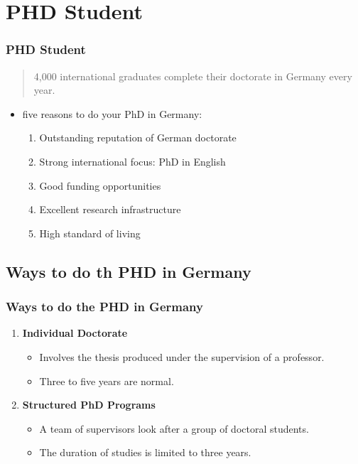 \documentclass[9pt, compress]{beamer}
\begin{document}
    \section{PHD Student }
    \begin{frame} 
        \frametitle{PHD Student}
        \begin{quotation}
            4,000 international graduates complete their doctorate in Germany every year.
        \end{quotation}
        \begin{itemize}
            \item five reasons to do your PhD in Germany:
            \begin{enumerate}
                \setcounter{enumi}{0}
                \item Outstanding reputation of German doctorate
                \item Strong international focus: PhD in English
                \item Good funding opportunities 
                \item Excellent research infrastructure
                \item High standard of living           
            \end{enumerate}
        \end{itemize}
    \end{frame}
    \subsection{Ways to do th PHD in Germany}
    \begin{frame} 
        \frametitle{Ways to do the PHD in Germany}
        \begin{enumerate}
            \setcounter{enumi}{0}
            \item \textbf{Individual Doctorate}
            \begin{itemize}
                \item Involves the thesis produced under the supervision of a professor. 
                \item Three to five years are normal. 
            \end{itemize}
            \item \textbf{Structured PhD Programs}
            \begin{itemize}
                \item A team of supervisors look after a group of doctoral students. 
                \item The duration of  studies is  limited to three years.
            \end{itemize}
        \end{enumerate} 
    \end{frame}
\end{document}
